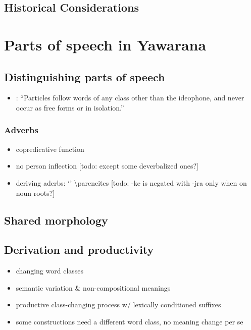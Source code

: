\documentclass{memoir}
\begin{document}
\section{\texorpdfstring{Historical Considerations
\label{sec:histphono}}{Historical Considerations }}

\chapter{\texorpdfstring{Parts of speech in Yawarana
\label{POS}}{Parts of speech in Yawarana }}

\section{Distinguishing parts of speech}

\begin{itemize}
\tightlist
\item
  \textcites[111]{koehn1986apalai}: ``Particles follow words of any
  class other than the ideophone, and never occur as free forms or in
  isolation.''
\end{itemize}

\subsection{Adverbs}

\begin{itemize}
\tightlist
\item
  copredicative function
\item
  no person inflection {[}todo: except some deverbalized ones?{]}
\item
  deriving aderbs:  `' \textbackslash parencites
  {[}todo: -ke is negated with -jra only when on noun roots?{]}
\end{itemize}

\section{Shared morphology}

\section{Derivation and productivity}

\begin{itemize}
\tightlist
\item
  changing word classes
\item
  semantic variation \& non-compositional meanings
\item
  productive class-changing process w/ lexically conditioned suffixes
\item
  some constructions need a different word class, no meaning change per
  se
\end{itemize}
\end{document}

